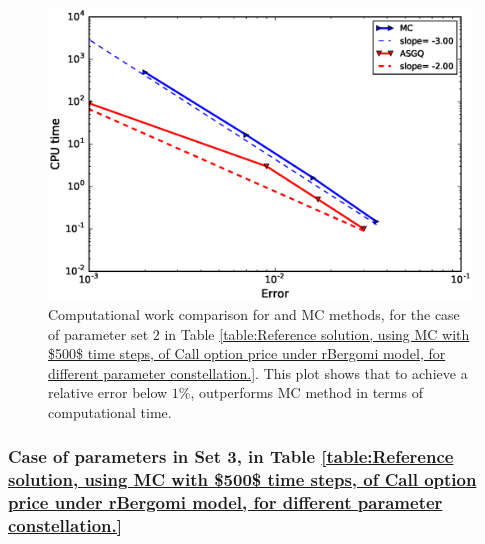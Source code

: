 %			
%

\FloatBarrier


	\begin{figure}[h!]
	\centering
	\includegraphics[width=0.5\linewidth]{./figures/rBergomi_Complexity_rates/set5/error_vs_time_set5_full_comparison}
	
	\caption{Computational work comparison for    and MC methods, for the case of parameter set $2$ in Table \ref{table:Reference solution, using MC with $500$ time steps, of Call option price under rBergomi model, for different parameter constellation.}. This plot shows that to achieve a relative error below $1\%$,  outperforms MC method in terms of computational time.}
	\label{fig:Complexity plot for  MISC for case set $3$ parameters, comparison}
\end{figure}


\FloatBarrier
\subsubsection{Case of parameters in Set 3, in Table \ref{table:Reference solution, using MC with $500$ time steps, of Call option price under rBergomi model, for different parameter constellation.} }\label{sec:Case of set 4 parameters}



